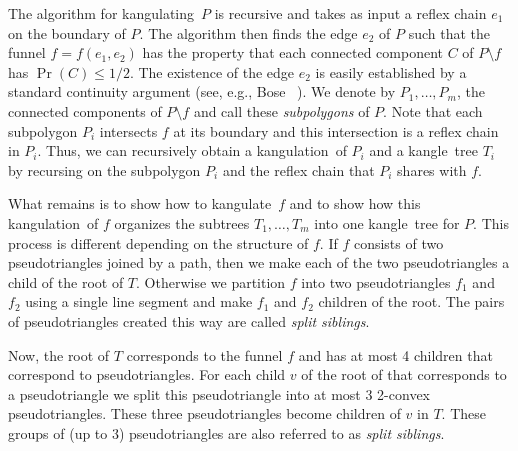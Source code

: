 \documentclass[charterfonts,lotsofwhite]{patmorin}
\newcommand{\kangle}{kangle}
\newcommand{\kangulation}{kangulation}
\newcommand{\kangulate}{kangulate}
\newcommand{\kangulating}{kangulating}
\begin{document}
The algorithm for \kangulating\ $P$ is recursive and takes as input a
reflex chain $e_1$ on the boundary of $P$.  The algorithm then finds
the edge $e_2$ of $P$ such that the funnel $f=f(e_1,e_2)$ has the
property that each connected component $C$ of $P\setminus f$ has
$\Pr(C)\le 1/2$. The existence of the edge $e_2$ is easily established
by a standard continuity argument (see, e.g., Bose \etal\
\cite{geoham}).  We denote by $P_1,\ldots,P_m$, the connected
components of $P\setminus f$ and call these \emph{subpolygons} of $P$.
Note that each subpolygon $P_i$ intersects $f$ at its boundary and
this intersection is a reflex chain in $P_i$.  Thus, we can
recursively obtain a \kangulation\ of $P_i$ and a \kangle\ tree $T_i$
by recursing on the subpolygon $P_i$ and the reflex chain that $P_i$
shares with $f$.

What remains is to show how to \kangulate\ $f$ and to show how this
\kangulation\ of $f$ organizes the subtrees $T_1,\ldots,T_m$ into one
\kangle\ tree for $P$. This process is different depending on the
structure of $f$.  If $f$ consists of two pseudotriangles joined by a
path, then we make each of the two pseudotriangles a child of the root
of $T$.  Otherwise we partition $f$ into two pseudotriangles $f_1$ and
$f_2$ using a single line segment and make $f_1$ and $f_2$ children of
the root.  The pairs of pseudotriangles created this way are called
\emph{split siblings}.

Now, the root of $T$ corresponds to the funnel $f$ and has at most 4
children that correspond to pseudotriangles.  For each child $v$ of the
root of that corresponds to a pseudotriangle we split this
pseudotriangle into at most 3 2-convex pseudotriangles.  These three
pseudotriangles become children of $v$ in $T$.  These groups of (up to
3) pseudotriangles are also referred to as \emph{split siblings}.
\end{document}
